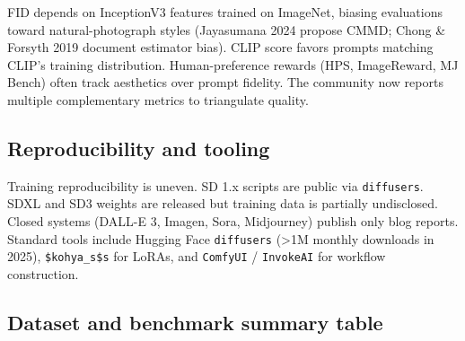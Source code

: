 \documentclass{article}
\begin{document}
FID depends on InceptionV3 features trained on ImageNet, biasing evaluations toward natural-photograph styles (Jayasumana 2024 propose CMMD; Chong \& Forsyth 2019 document estimator bias). CLIP score favors prompts matching CLIP's training distribution. Human-preference rewards (HPS, ImageReward, MJ Bench) often track aesthetics over prompt fidelity. The community now reports multiple complementary metrics to triangulate quality.

\subsection{Reproducibility and tooling}\label{reproducibility-and-tooling}

Training reproducibility is uneven. SD 1.x scripts are public via \texttt{diffusers}. SDXL and SD3 weights are released but training data is partially undisclosed. Closed systems (DALL-E 3, Imagen, Sora, Midjourney) publish only blog reports. Standard tools include Hugging Face \texttt{diffusers} (\textgreater1M monthly downloads in 2025), \texttt{\$kohya\_s\$s} for LoRAs, and \texttt{ComfyUI} / \texttt{InvokeAI} for workflow construction.

\subsection{Dataset and benchmark summary table}\label{dataset-and-benchmark-summary-table}
\end{document}
